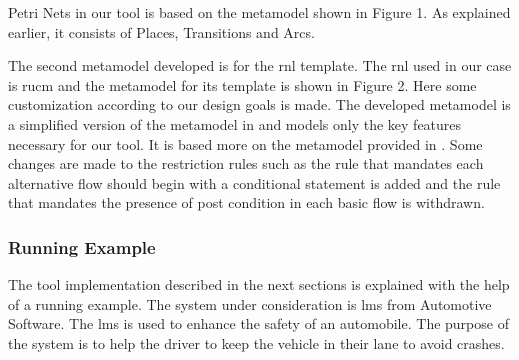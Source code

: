 Petri Nets in our tool is based on the metamodel shown in Figure 1. As explained earlier, it consists of Places, Transitions and Arcs. 

The second metamodel developed is for the \gls{rnl} template. The \gls{rnl} used in our case is \gls{rucm} and the metamodel for its template is shown in Figure 2. Here some customization according to our design goals is made. The developed metamodel is a simplified version of the metamodel in \cite{yue2013facilitating} and models only the key features necessary for our tool. It is based more on the metamodel provided in \cite{calisaya2016analysis}. Some changes are made to the restriction rules such as the rule that mandates each alternative flow should begin with a conditional statement is added and the rule that mandates the presence of post condition in each basic flow is withdrawn. 

\subsubsection{Running Example}
The tool implementation described in the next sections is explained with the help of a running example. The system under consideration is \gls{lms} from Automotive Software. The \gls{lms} is used to enhance the safety of an automobile. The purpose of the system is to help the driver to keep the vehicle in their lane to avoid crashes. 

